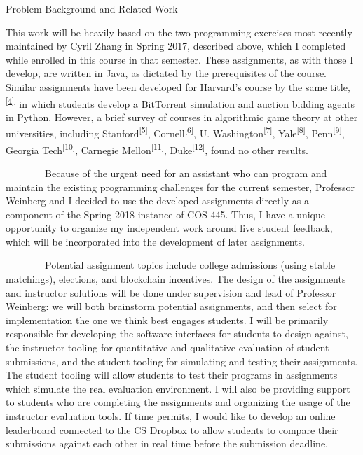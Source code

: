 \documentclass[]{article}
\begin{document}
{Problem Background and Related Work}

{This work will be heavily based on the two programming exercises most
recently maintained by Cyril Zhang in Spring 2017, described above,
which I completed while enrolled in this course in that semester. These
assignments, as with those I develop, are written in Java, as dictated
by the prerequisites of the course. Similar assignments have been
developed for Harvard's course by the same
title,}\textsuperscript{\protect\hyperlink{ftnt4}{{[}4{]}}}{~in which
students develop a BitTorrent simulation and auction bidding agents in
Python. However, a brief survey of courses in algorithmic game theory at
other universities, including
Stanford}\textsuperscript{\protect\hyperlink{ftnt5}{{[}5{]}}}{,
Cornell}\textsuperscript{\protect\hyperlink{ftnt6}{{[}6{]}}}{, U.
Washington}\textsuperscript{\protect\hyperlink{ftnt7}{{[}7{]}}}{,
Yale}\textsuperscript{\protect\hyperlink{ftnt8}{{[}8{]}}}{,
Penn}\textsuperscript{\protect\hyperlink{ftnt9}{{[}9{]}}}{, Georgia
Tech}\textsuperscript{\protect\hyperlink{ftnt10}{{[}10{]}}}{, Carnegie
Mellon}\textsuperscript{\protect\hyperlink{ftnt11}{{[}11{]}}}{,
Duke}\textsuperscript{\protect\hyperlink{ftnt12}{{[}12{]}}}{, found no
other results.}

{~~~~~~~~Because of the urgent need for an assistant who can program and
maintain the existing programming challenges for the current semester,
Professor Weinberg and I decided to use the developed assignments
directly as a component of the Spring 2018 instance of COS 445. Thus, I
have a unique opportunity to organize my independent work around live
student feedback, which will be incorporated into the development of
later assignments.}

{~~~~~~~~Potential assignment topics include college admissions (using
stable matchings), elections, and blockchain incentives. The design of
the assignments and instructor solutions will be done under supervision
and lead of Professor Weinberg: we will both brainstorm potential
assignments, and then select for implementation the one we think best
engages students. I will be primarily responsible for developing the
software interfaces for students to design against, the instructor
tooling for quantitative and qualitative evaluation of student
submissions, and the student tooling for simulating and testing their
assignments. The student tooling will allow students to test their
programs in assignments which simulate the real evaluation environment.
I will also be providing support to students who are completing the
assignments and organizing the usage of the instructor evaluation tools.
If time permits, I would like to develop an online leaderboard connected
to the CS Dropbox to allow students to compare their submissions against
each other in real time before the submission deadline.}
\end{document}
